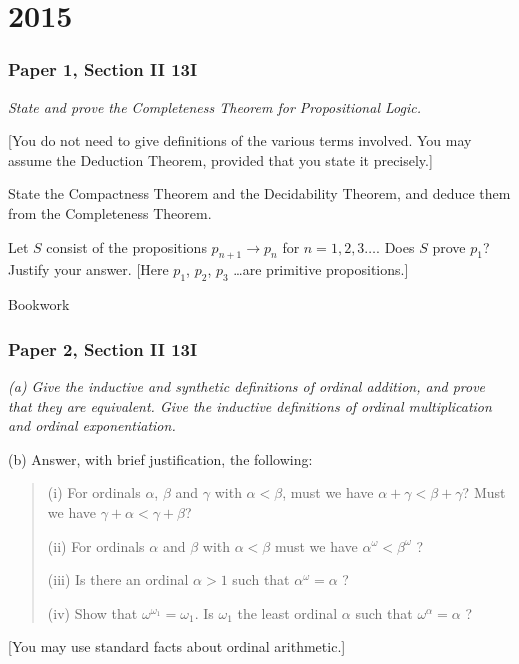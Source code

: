 \documentclass{book}
\begin{document}
\chapter{2015}


\subsection*{Paper 1, Section II 13I}
{\sl State and prove the Completeness Theorem for Propositional Logic.

[You do not need to give definitions of the various terms
  involved. You may assume the Deduction Theorem, provided that you
  state it precisely.]

State the Compactness Theorem and the Decidability Theorem, and deduce them from the Completeness Theorem.

Let $S$ consist of the propositions $p_{n+1} \to p_n$ for $n = 1, 2,
3 \ldots$. Does $S$ prove $p_1$?  Justify your answer. [Here $p_1$,
  $p_2$, $p_3$ \ldots are primitive propositions.]}

\medskip

Bookwork

\subsection*{Paper 2, Section II 13I}

{\sl (a) Give the inductive and synthetic definitions of ordinal addition, 
and prove that they are equivalent. Give the inductive definitions of 
ordinal multiplication and ordinal exponentiation.  

(b) Answer, with brief justification, the following: 
\begin{quote}
(i) For ordinals $\alpha$, $\beta$ and $\gamma$ with $\alpha < \beta$, must
we have $\alpha + \gamma <\beta + \gamma$?  Must we have $\gamma+\alpha
< \gamma + \beta$?

(ii) For ordinals $\alpha$ and $\beta$ with $\alpha < \beta$ must we
have $\alpha^\omega <\beta^\omega$ ?

(iii) Is there an ordinal $\alpha > 1$ such that $\alpha^\omega = \alpha$ ?  

(iv) Show that $\omega^{\omega_1} = \omega_1$. Is $\omega_1$ the least
ordinal $\alpha$ such that $\omega^\alpha = \alpha$ ?  
\end{quote}
[You may use standard facts about ordinal arithmetic.]}

\bigskip
\end{document}
